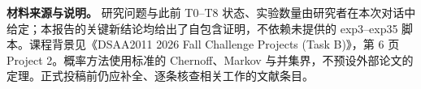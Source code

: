 \documentclass[11pt,a4paper]{ctexart}
\theoremstyle{definition}
\begin{document}
\vspace{0.3cm}
\noindent\textbf{材料来源与说明。} 研究问题与此前 T0--T8 状态、实验数量由研究者在本次对话中给定；本报告的关键新结论均给出了自包含证明，不依赖未提供的 exp3--exp35 脚本。课程背景见《DSAA2011 2026 Fall Challenge Projects (Task B)》，第 6 页 Project 2。概率方法使用标准的 Chernoff、Markov 与并集界，不预设外部论文的定理。正式投稿前仍应补全、逐条核查相关工作的文献条目。
\end{document}
